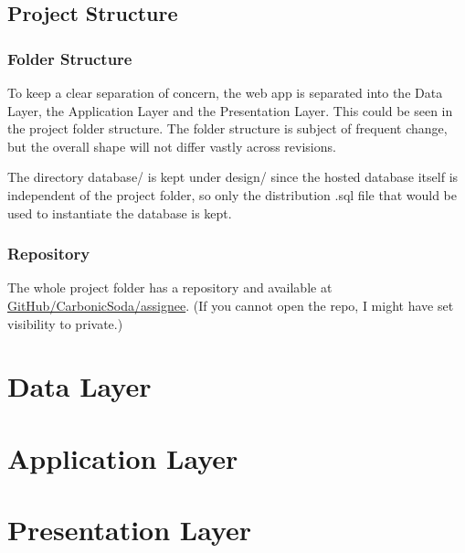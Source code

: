 \documentclass[12pt]{report}
\begin{document}
\newpage
\section{Project Structure} \label{overview.project-structure}

\subsection{Folder Structure} \label{overview.project-structure.folder-structure}

To keep a clear separation of concern, the web app is separated into
the Data Layer, the Application Layer and the Presentation Layer.
This could be seen in the project folder structure.
The folder structure is subject of frequent change, but the overall shape will not differ vastly across revisions.
\vspace{1 em}

\vspace{1 em}

The directory database/ is kept under design/ since the hosted database itself is independent of the project folder,
so only the distribution .sql file that would be used to instantiate the database is kept.

\subsection{Repository} \label{overview.project-structure.repository}

The whole project folder has a repository and available at
\href{https://github.com/CarbonicSoda/assignee}{GitHub/Carbonic\-Soda/assignee}.
(If you cannot open the repo, I might have set visibility to private.)

\chapter{Data Layer} \label{data-layer}


\chapter{Application Layer} \label{application-layer}


\chapter{Presentation Layer} \label{presentation-layer}
\end{document}
